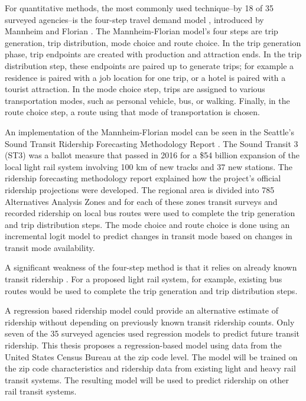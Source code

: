 \documentclass[11pt]{report}
\begin{document}
For quantitative methods, the most commonly used technique--by 18 of 35 surveyed agencies--is the four-step travel demand model \cite{McNally2008}, introduced by Mannheim and Florian \cite{Mannheim1979, Florian1988}. The Mannheim-Florian model's four steps are trip generation, trip distribution, mode choice and route choice. In the trip generation phase, trip endpoints are created with production and attraction ends. In the trip distribution step, these endpoints are paired up to generate trips; for example a residence is paired with a job location for one trip, or a hotel is paired with a tourist attraction. In the mode choice step, trips are assigned to various transportation modes, such as personal vehicle, bus, or walking. Finally, in the route choice step, a route using that mode of transportation is chosen.

An implementation of the Mannheim-Florian model can be seen in the Seattle's Sound Transit Ridership Forecasting Methodology Report \cite{ST3_2015, ST3_add}. The Sound Transit 3 (ST3) was a ballot measure that passed in 2016 for a \$54 billion expansion of the local light rail system involving 100 km of new tracks and 37 new stations. The ridership forecasting methodology report explained how the project's official ridership projections were developed. The regional area is divided into 785 Alternatives Analysis Zones and for each of these zones transit surveys and recorded ridership on local bus routes were used to complete the trip generation and trip distribution steps. The mode choice and route choice is done using an incremental logit model to predict changes in transit mode based on changes in transit mode availability.

A significant weakness of the four-step method is that it relies on already known transit ridership \cite{NCTR}. For a proposed light rail system, for example, existing bus routes would be used to complete the trip generation and trip distribution steps.

A regression based ridership model could provide an alternative estimate of ridership without depending on previously known transit ridership counts. Only seven of the 35 surveyed agencies used regression models to predict future transit ridership. This thesis proposes a regression-based model using data from the United States Census Bureau at the zip code level. The model will be trained on the zip code characteristics and ridership data from existing light and heavy rail transit systems. The resulting model will be used to predict ridership on other rail transit systems.  
\end{document}
